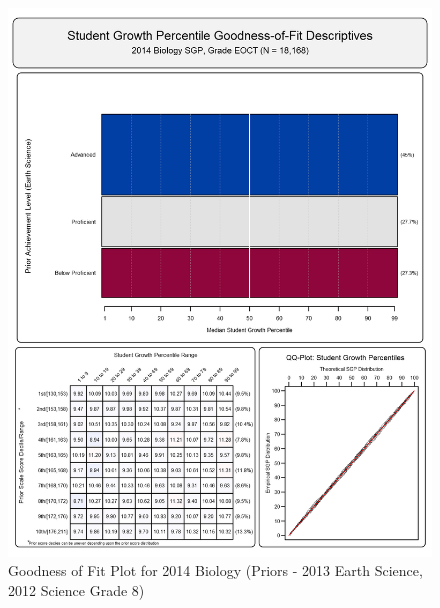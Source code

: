 \documentclass[12pt]{article}
\begin{document}
\begin{figure}[htbp]
\centering
\includegraphics{../img/Goodness_of_Fit/BIOLOGY.2014/2014_BIOLOGY_EOCT;2013_EARTH_SCIENCE_EOCT;2012_SCIENCE_8.png}
\caption{Goodness of Fit Plot for 2014 Biology (Priors - 2013 Earth
Science, 2012 Science Grade 8)}
\end{figure}
\end{document}
